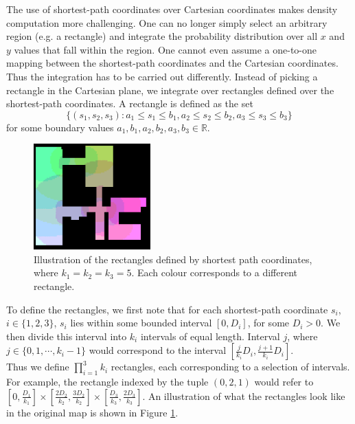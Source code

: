 \documentclass[letterpaper]{article}
\begin{document}
The use of shortest-path coordinates over Cartesian coordinates makes density computation more challenging. One can no longer simply select an arbitrary region (e.g. a rectangle) and integrate the probability distribution over all $x$ and $y$ values that fall within the region. One cannot even assume a one-to-one mapping between the shortest-path coordinates and the Cartesian coordinates. \\

Thus the integration has to be carried out differently. Instead of picking a rectangle in the Cartesian plane, we integrate over rectangles defined over the shortest-path coordinates. A rectangle is defined as the set 
\[\{(s_1,s_2,s_3) : a_1\leq s_1\leq b_1, a_2\leq s_2\leq b_2, a_3\leq s_3\leq b_3\}\]
for some boundary values $a_1,b_1,a_2,b_2,a_3,b_3 \in \mathbb{R}$.\\

\begin{figure}[!h]
  \centering
    \includegraphics[width=170px]{diagrams/sprectangles.png}
  \caption{Illustration of the rectangles defined by shortest path coordinates, where $k_1 = k_2 = k_3 = 5$. Each colour corresponds to a different rectangle.}
  \label{fig:sprectangles}
\end{figure}

To define the rectangles, we first note that for each shortest-path coordinate $s_i$, $i \in \{1,2,3\}$, $s_i$ lies within some bounded interval $[0,D_i]$, for some $D_i > 0$. We then divide this interval into $k_i$ intervals of equal length. Interval $j$, where $j \in \{0,1,\cdots,k_i-1\}$ would correspond to the interval $[\frac{j}{k_i}D_i, \frac{j+1}{k_i}D_i]$.\\

Thus we define $\prod_{i=1}^3 k_i$ rectangles, each corresponding to a selection of intervals. For example, the rectangle indexed by the tuple $(0,2,1)$ would refer to $[0,\frac{D_1}{k_1}]\times [\frac{2D_2}{k_2},\frac{3D_2}{k_2}]\times [\frac{D_3}{k_3},\frac{2D_3}{k_3}]$. An illustration of what the rectangles look like in the original map is shown in Figure \ref{fig:sprectangles}.\\
\end{document}
